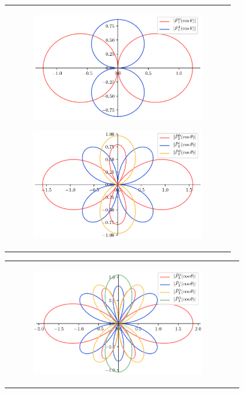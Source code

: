 \documentclass[../main/main]{subfiles}
\begin{document}
\begin{figure}[tb]
\begin{tabular}{c}
\hspace{-24pt}
 \begin{minipage}{0.50\hsize}\small
    \begin{figure}[H]
      \centering
      \includegraphics[width=75mm]{../fig/legendre/assoc_legendre_cos1.png}
    \end{figure}
 \end{minipage}

 \begin{minipage}{0.50\hsize}
    \begin{figure}[H]
      \centering
      \includegraphics[width=75mm]{../fig/legendre/assoc_legendre_cos2.png}
    \end{figure}
 \end{minipage}
\end{tabular}

\begin{tabular}{cc}
\hspace{-24pt}
 \begin{minipage}{0.50\hsize}
    \begin{figure}[H]
      \centering
      \includegraphics[width=75mm]{../fig/legendre/assoc_legendre_cos3.png}
    \end{figure}
 \end{minipage}


\end{tabular}
\end{figure}
\end{document}
